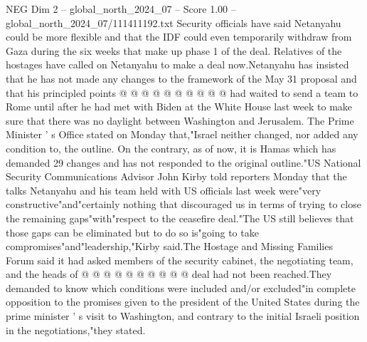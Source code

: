 \begin{textsample}{NEG Dim 2 – global\_north\_2024\_07 – Score 1.00 – global\_north\_2024\_07/111411192.txt}
Security officials have said Netanyahu could be more flexible and that the IDF could even temporarily withdraw from Gaza during the six weeks that make up phase 1 of the deal.
Relatives of the hostages have called on Netanyahu to make a deal now.Netanyahu has insisted that he has not made any changes to the framework of the May 31 proposal and that his principled points @ @ @ @ @ @ @ @ @ @ had waited to send a team to Rome until after he had met with Biden at the White House last week to make sure that there was no daylight between Washington and Jerusalem.
The Prime Minister ' s Office stated on Monday that,"Israel neither changed, nor added any condition to, the outline.
On the contrary, as of now, it is Hamas which has demanded 29 changes and has not responded to the original outline."US National Security Communications Advisor John Kirby told reporters Monday that the talks Netanyahu and his team held with US officials last week were"very constructive"and"certainly nothing that discouraged us in terms of trying to close the remaining gaps"with"respect to the ceasefire deal."The US still believes that those gaps can be eliminated but to do so is"going to take compromises"and"leadership,"Kirby said.The Hostage and Missing Families Forum said it had asked members of the security cabinet, the negotiating team, and the heads of @ @ @ @ @ @ @ @ @ @ deal had not been reached.They demanded to know which conditions were included and/or excluded"in complete opposition to the promises given to the president of the United States during the prime minister ' s visit to Washington, and contrary to the initial Israeli position in the negotiations,"they stated.

\end{textsample}

